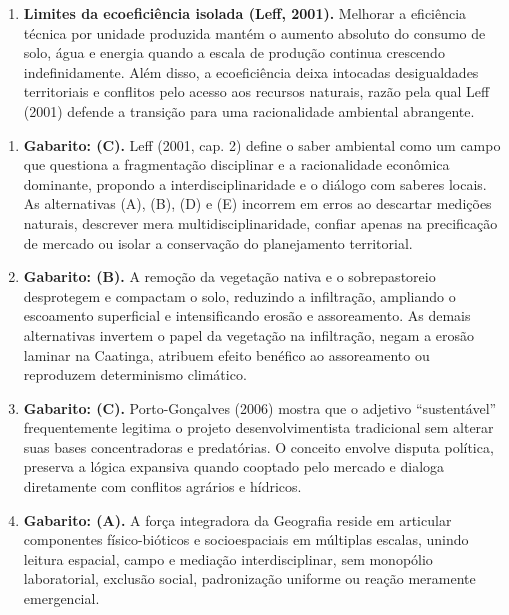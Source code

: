\begin{boxGabarito}
\begin{enumerate}[leftmargin=1.8em, itemsep=4pt, start=6]
  \item \textbf{Limites da ecoeficiência isolada (Leff, 2001).} Melhorar a eficiência técnica por unidade produzida mantém o aumento absoluto do consumo de solo, água e energia quando a escala de produção continua crescendo indefinidamente. Além disso, a ecoeficiência deixa intocadas desigualdades territoriais e conflitos pelo acesso aos recursos naturais, razão pela qual Leff (2001) defende a transição para uma racionalidade ambiental abrangente.
\end{enumerate}
\end{boxGabarito}

\begin{boxGabarito}
\begin{enumerate}[leftmargin=1.8em, itemsep=4pt, start=11]
  \item \textbf{Gabarito: (C).} Leff (2001, cap. 2) define o saber ambiental como um campo que questiona a fragmentação disciplinar e a racionalidade econômica dominante, propondo a interdisciplinaridade e o diálogo com saberes locais. As alternativas (A), (B), (D) e (E) incorrem em erros ao descartar medições naturais, descrever mera multidisciplinaridade, confiar apenas na precificação de mercado ou isolar a conservação do planejamento territorial.

  \item \textbf{Gabarito: (B).} A remoção da vegetação nativa e o sobrepastoreio desprotegem e compactam o solo, reduzindo a infiltração, ampliando o escoamento superficial e intensificando erosão e assoreamento. As demais alternativas invertem o papel da vegetação na infiltração, negam a erosão laminar na Caatinga, atribuem efeito benéfico ao assoreamento ou reproduzem determinismo climático.

  \item \textbf{Gabarito: (C).} Porto-Gonçalves (2006) mostra que o adjetivo ``sustentável'' frequentemente legitima o projeto desenvolvimentista tradicional sem alterar suas bases concentradoras e predatórias. O conceito envolve disputa política, preserva a lógica expansiva quando cooptado pelo mercado e dialoga diretamente com conflitos agrários e hídricos.

  \item \textbf{Gabarito: (A).} A força integradora da Geografia reside em articular componentes físico-bióticos e socioespaciais em múltiplas escalas, unindo leitura espacial, campo e mediação interdisciplinar, sem monopólio laboratorial, exclusão social, padronização uniforme ou reação meramente emergencial.


\end{enumerate}
\end{boxGabarito}
